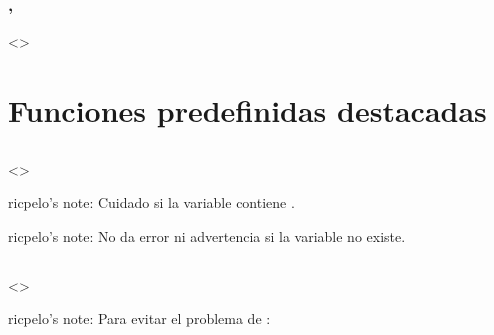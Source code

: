 \documentclass[a4paper,12pt,spanish]{sphinxmanual}
\begin{document}
\subsubsection{, }
\label{\detokenize{php:include-once-require-once}}
\textless{}\textgreater{}


\section{Funciones predefinidas destacadas}
\label{\detokenize{php:funciones-predefinidas-destacadas}}

\subsection{}
\label{\detokenize{php:isset}}
\textless{}\textgreater{}

\begin{DUlineblock}{0em}
\item[] ricpelo’s note: Cuidado si la variable contiene .
\item[] ricpelo’s note: No da error ni advertencia si la variable no existe.
\end{DUlineblock}


\subsection{}
\label{\detokenize{php:empty}}
\textless{}\textgreater{}

ricpelo’s note: Para evitar el problema de :

%
\begin{sphinxVerbatim}[commandchars=\\\{\}]
  
       
\end{sphinxVerbatim}
\end{document}
